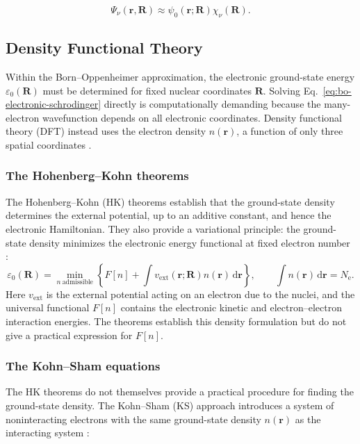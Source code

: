 \documentclass[12pt,a4paper]{article}
\numberwithin{equation}{section}
\begin{document}
\begin{equation}
  \Psi_\nu(\bm r,\bm R)
    \approx\psi_0(\bm r;\bm R)\chi_\nu(\bm R).
  \label{eq:bo-total-wavefunction}
\end{equation}

\subsection{Density Functional Theory}
\label{sec:dft}

Within the Born--Oppenheimer approximation, the electronic ground-state
energy $\varepsilon_0(\bm R)$ must be determined for fixed nuclear
coordinates $\bm R$. Solving Eq.~\eqref{eq:bo-electronic-schrodinger}
directly is computationally demanding because the many-electron
wavefunction depends on all electronic coordinates. Density functional
theory (DFT) instead uses the electron density $n(\bm r)$, a function of
only three spatial coordinates \cite{hohenberg1964,kohn1965}.

\subsubsection{The Hohenberg--Kohn theorems}

The Hohenberg--Kohn (HK) theorems establish that the ground-state density
determines the external potential, up to an additive constant, and hence
the electronic Hamiltonian. They also provide a variational principle:
the ground-state density minimizes the electronic energy functional at
fixed electron number \cite{hohenberg1964}:
\begin{equation}
  \varepsilon_0(\bm R)
    =\min_{n\ \mathrm{admissible}}
      \left\{F[n]+\int v_{\mathrm{ext}}(\bm r;\bm R)n(\bm r)
      \,\mathrm d\bm r\right\},
  \qquad \int n(\bm r)\,\mathrm d\bm r=N_{\mathrm e}.
  \label{eq:hk-variational-principle}
\end{equation}
Here $v_{\mathrm{ext}}$ is the external potential acting on an electron due to the nuclei,
and the universal functional $F[n]$ contains the
electronic kinetic and electron--electron interaction energies. The
theorems establish this density formulation but do not give a practical
expression for $F[n]$.

\subsubsection{The Kohn--Sham equations}

The HK theorems do not themselves provide a practical procedure for finding the ground-state density.
The Kohn--Sham (KS) approach introduces a system of noninteracting electrons with the same ground-state density $n(\bm r)$ as the interacting system \cite{kohn1965}:
\end{document}
